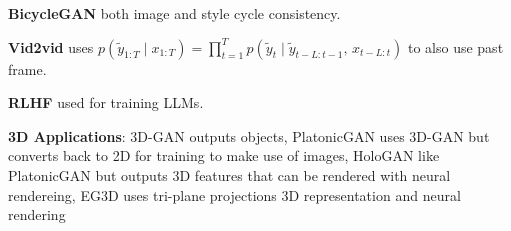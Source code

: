 \textbf{BicycleGAN} both image and style cycle consistency.

\textbf{Vid2vid} uses $p(\tilde{y}_{1:T} \mid x_{1:T}) = \prod_{t=1}^{T} p(\tilde{y}_t \mid \tilde{y}_{t-L:t-1}, \, x_{t-L:t})$ to also use past frame.


\textbf{RLHF} used for training LLMs.

\textbf{3D Applications}: 3D-GAN outputs objects, PlatonicGAN uses 3D-GAN but converts back to 2D for training to make use of images, HoloGAN like PlatonicGAN but outputs 3D features that can be rendered with neural rendereing, EG3D uses tri-plane projections 3D representation and neural rendering

